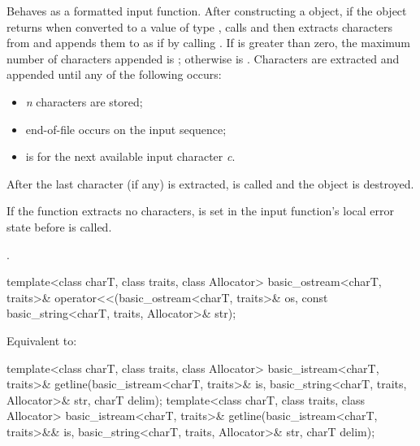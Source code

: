 \begin{itemdescr}
\pnum
\effects
Behaves as a formatted input function.
After constructing a  object,
if the  object returns 
when converted to a value of type ,
calls 
and then extracts characters from  and appends them
to  as if by calling
.
If
is greater than zero, the maximum
number  of characters appended is
;
otherwise  is
.
Characters are extracted and appended until any of the following
occurs:
\begin{itemize}
\item
\textit{n}
characters are stored;
\item
end-of-file occurs on the input sequence;
\item
{}
is  for the next available input character
\textit{c}.
\end{itemize}

\pnum
After the last character (if any) is extracted,
is called and the
object is destroyed.

\pnum
If the function extracts no characters,
 is set in the input function's local error state
before  is called.

\pnum
\returns
{}.
\end{itemdescr}

%
\begin{itemdecl}
template<class charT, class traits, class Allocator>
  basic_ostream<charT, traits>&
    operator<<(basic_ostream<charT, traits>& os,
               const basic_string<charT, traits, Allocator>& str);
\end{itemdecl}

\begin{itemdescr}
\pnum
\effects
Equivalent to: 
\end{itemdescr}

%
\begin{itemdecl}
template<class charT, class traits, class Allocator>
  basic_istream<charT, traits>&
    getline(basic_istream<charT, traits>& is,
            basic_string<charT, traits, Allocator>& str,
            charT delim);
template<class charT, class traits, class Allocator>
  basic_istream<charT, traits>&
    getline(basic_istream<charT, traits>&& is,
            basic_string<charT, traits, Allocator>& str,
            charT delim);
\end{itemdecl}

